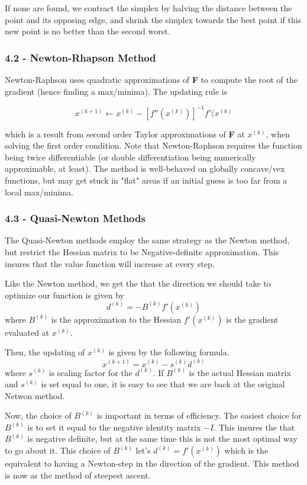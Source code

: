\documentclass{article}
\begin{document}
If none are found, we contract the simplex by halving the distance between the point and its opposing edge, and shrink the simplex towards the best point if this new point is no better than the second worst. 

\subsubsection*{4.2 - Newton-Rhapson Method}

Newton-Raphson uses quadratic approximations of \textbf{F} to compute the root of the gradient (hence finding a max/minima). The updating rule is 

$$x^{(k+1)} \leftarrow x^{(k)} - [f''(x^{(k)})]^{-1}f'(x^{(k)}$$

which is a result from second order Taylor approximations of \textbf{F} at $x^{(k)}$, when solving the first order condition. Note that Newton-Raphson requires the function being twice differentiable (or double differentiation being numerically approximable, at least). The method is well-behaved on globally concave/vex functions, but may get stuck in "flat" areas if an initial guess is too far from a local max/minima. 

\subsubsection*{4.3 - Quasi-Newton Methods}


The Quasi-Newton methods employ the same strategy as the Newton method, but restrict the Hessian matrix to be Negative-definite approximation. This insures that the value function will increase at every step.

Like the Newton method, we get the that the direction we should take to optimize our function is given by
$$
d^{(k)}= - B^{(k)}f'(x^{(k)})
$$
where $B^{(k)}$ is the approximation to the Hessian $f'(x^{(k)})$ is the gradient evaluated at $x^{(k)}$.

Then, the updating of $x^{(k)}$ is given by the following formula.
$$
x^{(k+1)}= x^{(k)}-s^{(k)}d^{(k)}
$$
where $s^{(k)}$ is scaling factor for the $d^{(k)}$. If $B^{(k)}$ is the actual Hessian matrix and $s^{(k)}$ is set equal to one, it is easy to see that we are back at the original Netwon method.

Now, the choice of $B^{(k)}$ is important in terms of efficiency. The easiest choice for $B^{(k)}$ is to set it equal to the negative identity matrix $-I$. This insures the that $B^{(k)}$ is negative definite, but at the same time this is not the most optimal way to go about it. This choice of $B^{(k)}$ let's $d^{(k)}= f'(x^{(k)})$ which is the equivalent to having a Newton-step in the direction of the gradient. This method is now as the method of steepest ascent. 
\end{document}
